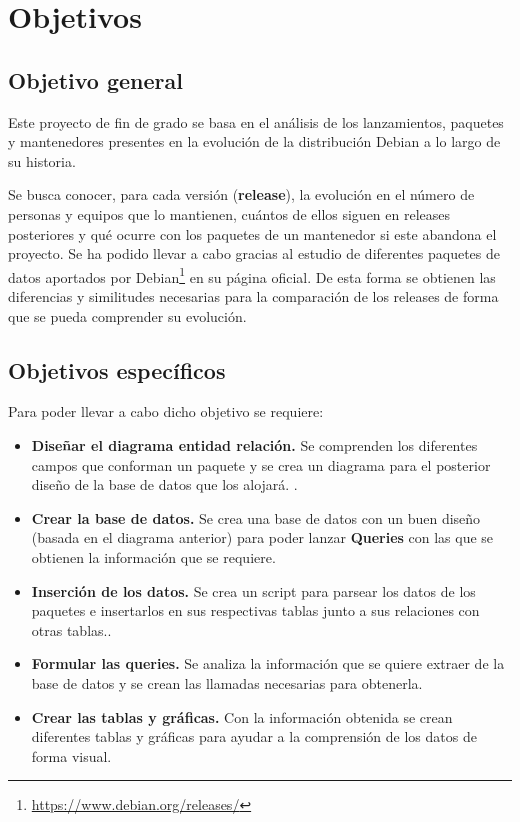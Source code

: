 \documentclass[a4paper, 12pt]{book}
\begin{document}
\cleardoublepage %
\chapter{Objetivos} %
\label{chap:objetivos} %



\section{Objetivo general} %
\label{sec:objetivo-general} %

Este proyecto de fin de grado se basa en el análisis de los lanzamientos, paquetes y mantenedores presentes en la evolución de la distribución Debian a lo largo de su historia. 

Se busca conocer, para cada versión (\textbf{release}), la evolución en el número de personas y equipos que lo mantienen,  cuántos de ellos siguen en releases posteriores y qué ocurre con los paquetes de un mantenedor si este abandona el proyecto. Se ha podido llevar a cabo gracias al estudio de diferentes paquetes de datos aportados por Debian\footnote{\url{https://www.debian.org/releases/}} en su página oficial.
De esta forma se obtienen las diferencias y similitudes necesarias para la comparación de los releases de forma que se pueda comprender su evolución.


\section{Objetivos específicos}
\label{sec:objetivos-especificos}

Para poder llevar a cabo dicho objetivo se requiere: 

\begin{itemize}
	\item \textbf {Diseñar el diagrama entidad relación.} Se comprenden los diferentes campos que conforman un paquete y se crea un diagrama para el posterior diseño de la base de datos que los alojará.
	.
	\item \textbf {Crear la base de datos.} Se crea una base de datos con un buen diseño (basada en el diagrama anterior) para poder lanzar \textbf {Queries} con las que se obtienen la información que se requiere.
	
	\item \textbf {Inserción de los datos.} Se crea un script para parsear los datos de los paquetes e insertarlos en sus respectivas tablas junto a sus relaciones con otras tablas..
	
	\item \textbf {Formular las queries.} Se analiza la información que se quiere extraer de la base de datos y se crean las llamadas necesarias para obtenerla.
	
	
	\item \textbf {Crear las tablas y gráficas.} Con la información obtenida se crean diferentes tablas y gráficas para ayudar a la comprensión de los datos de forma visual.
\end{itemize}
\end{document}
